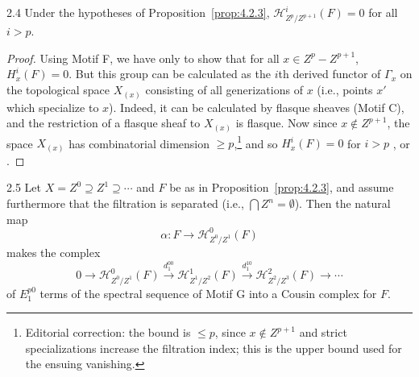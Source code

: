 \begin{booklemma}{2.4}\label{lem:4.2.4}
Under the hypotheses of Proposition~\ref{prop:4.2.3}, $\mathcal{H}_{Z^{p}/Z^{p+1}}^{i}(F)=0$ for all $i>p$.
\end{booklemma}

\begin{proof}
Using Motif F, we have only to show that for all $x\in Z^p-Z^{p+1}$, $H_x^{i}(F)=0$. But this group can be calculated as the $i$th derived functor of $\Gamma_x$ on the topological space $X_{(x)}$ consisting of all generizations of $x$ (i.e., points $x'$ which specialize to $x$). Indeed, it can be calculated by flasque sheaves (Motif C), and the restriction of a flasque sheaf to $X_{(x)}$ is flasque. Now since $x\notin Z^{p+1}$, the space $X_{(x)}$ has combinatorial dimension $\geq p$,\footnote{Editorial correction: the bound is $\leq p$, since $x\notin Z^{p+1}$ and strict specializations increase the filtration index; this is the upper bound used for the ensuing vanishing.} and so $H_x^{i}(F)=0$ for $i>p$ \cite[\nopp II,~4.15.2]{G}, or \cite[]{LC}.
\end{proof}

\begin{bookproposition}{2.5}\label{prop:4.2.5}
Let $X=Z^0\supseteq Z^1\supseteq\cdots$ and $F$ be as in Proposition~\ref{prop:4.2.3}, and assume furthermore that the filtration is separated (i.e., $\bigcap Z^n=\emptyset$). Then the natural map
\[
\alpha\colon F\longrightarrow \mathcal{H}_{Z^{0}/Z^{1}}^{0}(F)
\]
makes the complex
\[
0\longrightarrow \mathcal{H}_{Z^{0}/Z^{1}}^{0}(F)\xrightarrow{d_1^{00}} \mathcal{H}_{Z^{1}/Z^{2}}^{1}(F)\xrightarrow{d_1^{10}} \mathcal{H}_{Z^{2}/Z^{3}}^{2}(F)\longrightarrow\cdots
\]
of $E_1^{p0}$ terms of the spectral sequence of Motif G into a Cousin complex for $F$.
\end{bookproposition}

